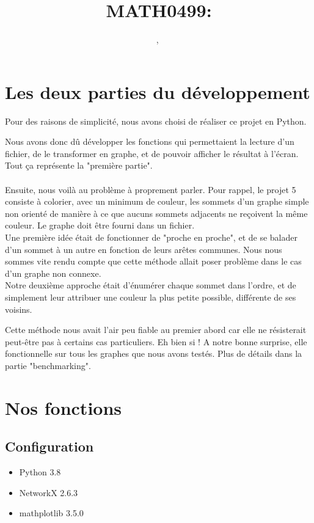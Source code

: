\documentclass[a4paper, 11pt, oneside]{article}
\title{MATH0499: \intitule}
\author{ \PrenomUN~\textsc{\NomUN}, \PrenomDEUX~\textsc{\NomDEUX}}
\date{}
\newcommand{\tablemat}{~}
\begin{document}
\maketitle
\newpage



\section{Les deux parties du développement}

Pour des raisons de simplicité, nous avons choisi de réaliser ce projet en Python.

Nous avons donc dû développer les fonctions qui permettaient la lecture d'un fichier, de le transformer en graphe, et de pouvoir afficher le résultat à l'écran. Tout ça représente la "première partie".
\\
\\
Ensuite, nous voilà au problème à proprement parler.
Pour rappel, le projet 5 consiste à  colorier, avec un minimum de couleur, les sommets d'un graphe simple non orienté de manière à ce que aucuns sommets adjacents ne reçoivent la même couleur. Le graphe doit être fourni dans un fichier.
\\


Une première idée était de fonctionner de "proche en proche", et de se balader d'un sommet à un autre en fonction de leurs arêtes communes.
Nous nous sommes vite rendu compte que cette méthode allait poser problème dans le cas d'un graphe non connexe.
\\

Notre deuxième approche était d'énumérer chaque sommet dans l'ordre, et de simplement leur attribuer une couleur la plus petite possible, différente de ses voisins.


Cette méthode nous avait l'air peu fiable au premier abord car elle ne résisterait peut-être pas à certains cas particuliers.
Eh bien si ! A notre bonne surprise, elle fonctionnelle sur tous les graphes que nous avons testés. Plus de détails dans la partie "benchmarking".




\section{Nos fonctions}
\subsection{Configuration}
\begin{itemize}
    \item Python 3.8
    \item NetworkX 2.6.3
    \item mathplotlib 3.5.0


\end{itemize}
\end{document}
